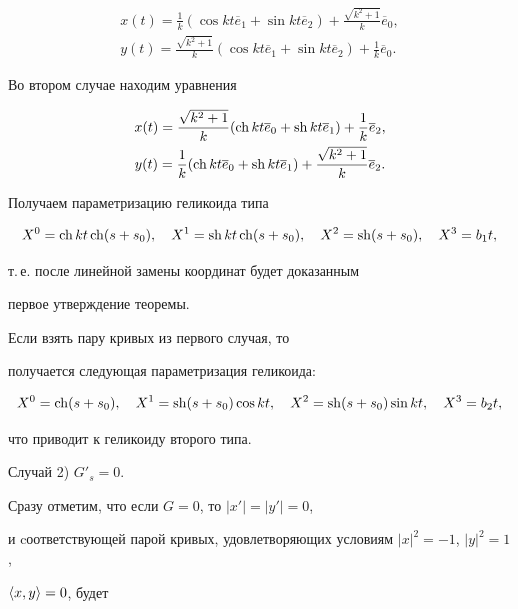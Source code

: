 \begin{pf}
\begin{gather*}
x(t)= \frac{1}{k}(\cos kt \overline e_1+ \sin kt \overline e_2) +


\frac{ \sqrt {k^2+1}}{k} \overline e_0,\\


y(t)= \frac{ \sqrt {k^2+1}}{k}( \cos kt \overline e_1 + \sin kt \overline e_2)+


\frac{1}{k} \overline e_0.


\end{gather*}


Во втором случае находим уравнения 


\begin{gather*}


x(t)=\frac{ \sqrt {k^2+1}}{k}(\ch kt \overline e_0+\sh kt \overline e_1) +


\frac {1}{k} \overline e_2,\\


y(t)= \frac{1}{k}(\ch kt \overline e_0+\sh kt \overline e_1)+ 


\frac{ \sqrt{k^2+1}}{k} \overline e_2.


\end{gather*} 


Получаем параметризацию геликоида типа 


$$


X^0=\ch kt\ch(s+s_0),\quad X^1=\sh kt\ch(s+s_0),\quad X^2=\sh(s+s_0),\quad X^3=b_1t,


$$


т.\,е. после линейной замены координат будет доказанным


первое утверждение теоремы.


Если взять пару кривых из первого случая, то


получается следующая параметризация  геликоида: 


$$


X^0=\ch(s+s_0),\quad X^1=\sh(s+s_0) \cos kt,\quad X^2=\sh(s+s_0) \sin kt,


\quad X^3=b_2t,


$$


что приводит к  геликоиду второго типа.





Случай  2) $G'_s=0$. 


Сразу отметим, что если $G=0$, то $|x'|=|y'|=0$,


и cоответствующей парой кривых, удовлетворяющих условиям $|x|^2=-1$, $|y|^2=1$,


$\langle x,y\rangle=0$, будет 



\end{pf}
